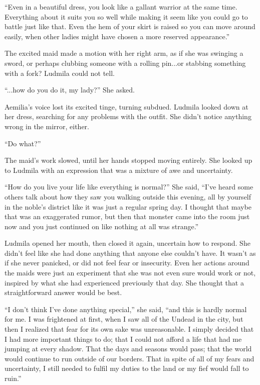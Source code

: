  

“Even in a beautiful dress, you look like a gallant warrior at the same time. Everything about it suits you so well while making it seem like you could go to battle just like that. Even the hem of your skirt is raised so you can move around easily, when other ladies might have chosen a more reserved appearance.”

 

The excited maid made a motion with her right arm, as if she was swinging a sword, or perhaps clubbing someone with a rolling pin...or stabbing something with a fork? Ludmila could not tell.

 

“...how do you do it, my lady?” She asked.

 

Aemilia’s voice lost its excited tinge, turning subdued. Ludmila looked down at her dress, searching for any problems with the outfit. She didn’t notice anything wrong in the mirror, either.

 

“Do what?”

 

The maid’s work slowed, until her hands stopped moving entirely. She looked up to Ludmila with an expression that was a mixture of awe and uncertainty.

 

“How do you live your life like everything is normal?” She said, “I’ve heard some others talk about how they saw you walking outside this evening, all by yourself in the noble’s district like it was just a regular spring day. I thought that maybe that was an exaggerated rumor, but then that monster came into the room just now and you just continued on like nothing at all was strange.”

 

Ludmila opened her mouth, then closed it again, uncertain how to respond. She didn’t feel like she had done anything that anyone else couldn’t have. It wasn’t as if she never panicked, or did not feel fear or insecurity. Even her actions around the maids were just an experiment that she was not even sure would work or not, inspired by what she had experienced previously that day. She thought that a straightforward answer would be best.

 

“I don’t think I’ve done anything special,” she said, “and this is hardly normal for me. I was frightened at first, when I saw all of the Undead in the city, but then I realized that fear for its own sake was unreasonable. I simply decided that I had more important things to do; that I could not afford a life that had me jumping at every shadow. That the days and seasons would pass; that the world would continue to run outside of our borders. That in spite of all of my fears and uncertainty, I still needed to fulfil my duties to the land or my fief would fall to ruin.”

